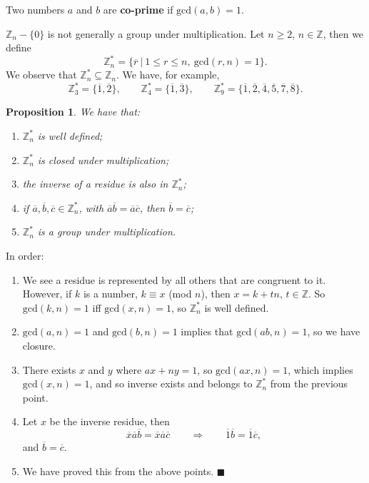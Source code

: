 \documentclass[letter-paper]{tufte-book}
\newtheorem{proposition}[theorem]{\color{pastel-blue}Proposition}
\newenvironment{proof}[1][Proof]{\begin{trivlist}
\item[\hskip \labelsep {\bfseries #1}]}{\end{trivlist}}
\newcommand\Def[1]{\textbf{#1}}
\newcommand{\qed}{\hfill$\blacksquare$}
\begin{document}
Two numbers $a$ and $b$ are \Def{co-prime} if $\mbox{gcd}(a,b)=1$.

$\mathbb{Z}_n-\{0\}$ is not generally a group under multiplication. Let
$n\geq2$, $n\in\mathbb{Z}$, then we define
\begin{equation*}
  \mathbb{Z}_n^* = \{\overline{r}\ |\ 1\leq r\leq n,\ \mbox{gcd}(r,n)=1\}.
\end{equation*}
We observe that $\mathbb{Z}_n^* \subseteq\mathbb{Z}_n$. We have, for example,
\begin{equation*}
  \mathbb{Z}_3^*=\{\overline{1},\overline{2}\},\qquad
  \mathbb{Z}_4^*=\{\overline{1},\overline{3}\},\qquad
  \mathbb{Z}_9^*=\{\overline{1},\overline{2},\overline{4},\overline{5},
  \overline{7},\overline{8}\}.
\end{equation*}

\begin{proposition}
  We have that:
  \begin{enumerate}
    \item $\mathbb{Z}_n^*$ is well defined;
    \item $\mathbb{Z}_n^*$ is closed under multiplication;
    \item the inverse of a residue is also in $\mathbb{Z}_n^*$;
    \item if $\overline{a},\overline{b},\overline{c}\in\mathbb{Z}_n^*$, with
    $\overline{a}\overline{b}=\overline{a}\overline{c}$, then
    $\overline{b}=\overline{c}$;
    \item $\mathbb{Z}_n^*$ is a group under multiplication.
  \end{enumerate}
\end{proposition}
\begin{proof}
  In order:
  \begin{enumerate}
    \item We see a residue is represented by all others that are congruent to
    it. However, if $k$ is a number, $k\equiv x$ (mod $n$), then $x=k+tn$,
    $t\in\mathbb{Z}$. So $\mbox{gcd}(k,n)=1$ iff $\mbox{gcd}(x,n)=1$, so
    $\mathbb{Z}_n^*$ is well defined.
    \item $\mbox{gcd}(a,n)=1$ and $\mbox{gcd}(b,n)=1$ implies that
    $\mbox{gcd}(ab,n)=1$, so we have closure.
    \item There exists $x$ and $y$ where $ax+ny=1$, so $\mbox{gcd}(ax,n)=1$,
    which implies $\mbox{gcd}(x,n)=1$, and so inverse exists and belongs to
    $\mathbb{Z}_n^*$ from the previous point.
    \item Let $x$ be the inverse residue, then
    \begin{equation*}
      \overline{x}\overline{a}\overline{b}=\overline{x}\overline{a}\overline{c}
      \qquad\Rightarrow\qquad
      \overline{1}\overline{b}=\overline{1}\overline{c},
    \end{equation*}
    and $\overline{b}=\overline{c}$.
    \item We have proved this from the above points. \qed
  \end{enumerate}
\end{proof}
\end{document}
